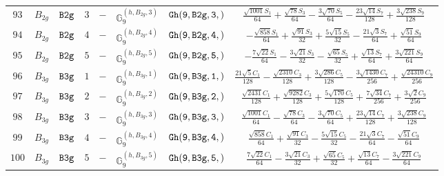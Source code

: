 \documentclass[fleqn,8pt]{jsarticle}
\begin{document}
\begin{table}[ht!]
\begin{center}
\begin{tabular}{cccccccc}
$ 93 $ & $ B_{2g} $ & $ {\tt B2g} $ & $ 3 $ & $ - $ & $ \mathbb{G}_{9}^{(h,B_{2g},3)} $ & $ {\tt Gh(9,B2g,3,)} $ & $ \frac{\sqrt{1001} S_{1}}{64} + \frac{\sqrt{78} S_{3}}{64} - \frac{3 \sqrt{70} S_{5}}{64} - \frac{23 \sqrt{14} S_{7}}{128} + \frac{3 \sqrt{238} S_{9}}{128} $ \\
$ 94 $ & $ B_{2g} $ & $ {\tt B2g} $ & $ 4 $ & $ - $ & $ \mathbb{G}_{9}^{(h,B_{2g},4)} $ & $ {\tt Gh(9,B2g,4,)} $ & $ - \frac{\sqrt{858} S_{1}}{64} + \frac{\sqrt{91} S_{3}}{32} + \frac{5 \sqrt{15} S_{5}}{32} - \frac{21 \sqrt{3} S_{7}}{64} + \frac{\sqrt{51} S_{9}}{64} $ \\
$ 95 $ & $ B_{2g} $ & $ {\tt B2g} $ & $ 5 $ & $ - $ & $ \mathbb{G}_{9}^{(h,B_{2g},5)} $ & $ {\tt Gh(9,B2g,5,)} $ & $ - \frac{7 \sqrt{22} S_{1}}{64} - \frac{3 \sqrt{21} S_{3}}{32} - \frac{\sqrt{65} S_{5}}{32} + \frac{\sqrt{13} S_{7}}{64} + \frac{3 \sqrt{221} S_{9}}{64} $ \\
$ 96 $ & $ B_{3g} $ & $ {\tt B3g} $ & $ 1 $ & $ - $ & $ \mathbb{G}_{9}^{(h,B_{3g},1)} $ & $ {\tt Gh(9,B3g,1,)} $ & $ \frac{21 \sqrt{5} C_{1}}{128} - \frac{\sqrt{2310} C_{3}}{128} + \frac{3 \sqrt{286} C_{5}}{128} - \frac{3 \sqrt{1430} C_{7}}{256} + \frac{\sqrt{24310} C_{9}}{256} $ \\
$ 97 $ & $ B_{3g} $ & $ {\tt B3g} $ & $ 2 $ & $ - $ & $ \mathbb{G}_{9}^{(h,B_{3g},2)} $ & $ {\tt Gh(9,B3g,2,)} $ & $ \frac{\sqrt{2431} C_{1}}{128} + \frac{\sqrt{9282} C_{3}}{128} + \frac{5 \sqrt{170} C_{5}}{128} + \frac{7 \sqrt{34} C_{7}}{256} + \frac{3 \sqrt{2} C_{9}}{256} $ \\
$ 98 $ & $ B_{3g} $ & $ {\tt B3g} $ & $ 3 $ & $ - $ & $ \mathbb{G}_{9}^{(h,B_{3g},3)} $ & $ {\tt Gh(9,B3g,3,)} $ & $ \frac{\sqrt{1001} C_{1}}{64} - \frac{\sqrt{78} C_{3}}{64} - \frac{3 \sqrt{70} C_{5}}{64} + \frac{23 \sqrt{14} C_{7}}{128} + \frac{3 \sqrt{238} C_{9}}{128} $ \\
$ 99 $ & $ B_{3g} $ & $ {\tt B3g} $ & $ 4 $ & $ - $ & $ \mathbb{G}_{9}^{(h,B_{3g},4)} $ & $ {\tt Gh(9,B3g,4,)} $ & $ \frac{\sqrt{858} C_{1}}{64} + \frac{\sqrt{91} C_{3}}{32} - \frac{5 \sqrt{15} C_{5}}{32} - \frac{21 \sqrt{3} C_{7}}{64} - \frac{\sqrt{51} C_{9}}{64} $ \\
$ 100 $ & $ B_{3g} $ & $ {\tt B3g} $ & $ 5 $ & $ - $ & $ \mathbb{G}_{9}^{(h,B_{3g},5)} $ & $ {\tt Gh(9,B3g,5,)} $ & $ \frac{7 \sqrt{22} C_{1}}{64} - \frac{3 \sqrt{21} C_{3}}{32} + \frac{\sqrt{65} C_{5}}{32} + \frac{\sqrt{13} C_{7}}{64} - \frac{3 \sqrt{221} C_{9}}{64} $ \\
 \hline \hline
\end{tabular}
\end{center}
\end{table}
\end{document}
